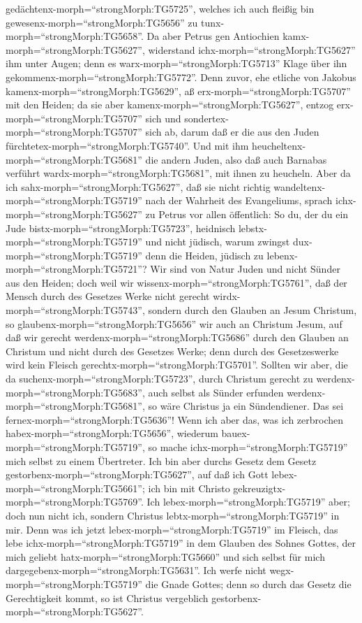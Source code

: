 gedächtenx-morph=``strongMorph:TG5725'', welches ich auch fleißig bin
gewesenx-morph=``strongMorph:TG5656'' zu
tunx-morph=``strongMorph:TG5658''.  Da aber Petrus gen
Antiochien kamx-morph=``strongMorph:TG5627'', widerstand
ichx-morph=``strongMorph:TG5627'' ihm unter Augen; denn es
warx-morph=``strongMorph:TG5713'' Klage über ihn
gekommenx-morph=``strongMorph:TG5772''.  Denn zuvor, ehe
etliche von Jakobus kamenx-morph=``strongMorph:TG5629'', aß
erx-morph=``strongMorph:TG5707'' mit den Heiden; da sie aber
kamenx-morph=``strongMorph:TG5627'', entzog
erx-morph=``strongMorph:TG5707'' sich und
sondertex-morph=``strongMorph:TG5707'' sich ab, darum daß er die aus den
Juden fürchtetex-morph=``strongMorph:TG5740''.  Und mit ihm
heucheltenx-morph=``strongMorph:TG5681'' die andern Juden, also daß auch
Barnabas verführt wardx-morph=``strongMorph:TG5681'', mit ihnen zu
heucheln.  Aber da ich sahx-morph=``strongMorph:TG5627'',
daß sie nicht richtig wandeltenx-morph=``strongMorph:TG5719'' nach der
Wahrheit des Evangeliums, sprach ichx-morph=``strongMorph:TG5627'' zu
Petrus vor allen öffentlich: So du, der du ein Jude
bistx-morph=``strongMorph:TG5723'', heidnisch
lebstx-morph=``strongMorph:TG5719'' und nicht jüdisch, warum zwingst
dux-morph=``strongMorph:TG5719'' denn die Heiden, jüdisch zu
lebenx-morph=``strongMorph:TG5721''?  Wir sind von Natur
Juden und nicht Sünder aus den Heiden;  doch weil wir
wissenx-morph=``strongMorph:TG5761'', daß der Mensch durch des Gesetzes
Werke nicht gerecht wirdx-morph=``strongMorph:TG5743'', sondern durch
den Glauben an Jesum Christum, so glaubenx-morph=``strongMorph:TG5656''
wir auch an Christum Jesum, auf daß wir gerecht
werdenx-morph=``strongMorph:TG5686'' durch den Glauben an Christum und
nicht durch des Gesetzes Werke; denn durch des Gesetzeswerke wird kein
Fleisch gerechtx-morph=``strongMorph:TG5701''.  Sollten wir
aber, die da suchenx-morph=``strongMorph:TG5723'', durch Christum
gerecht zu werdenx-morph=``strongMorph:TG5683'', auch selbst als Sünder
erfunden werdenx-morph=``strongMorph:TG5681'', so wäre Christus ja ein
Sündendiener. Das sei fernex-morph=``strongMorph:TG5636''! 
Wenn ich aber das, was ich zerbrochen
habex-morph=``strongMorph:TG5656'', wiederum
bauex-morph=``strongMorph:TG5719'', so mache
ichx-morph=``strongMorph:TG5719'' mich selbst zu einem Übertreter.
 Ich bin aber durchs Gesetz dem Gesetz
gestorbenx-morph=``strongMorph:TG5627'', auf daß ich Gott
lebex-morph=``strongMorph:TG5661''; ich bin mit Christo
gekreuzigtx-morph=``strongMorph:TG5769''.  Ich
lebex-morph=``strongMorph:TG5719'' aber; doch nun nicht ich, sondern
Christus lebtx-morph=``strongMorph:TG5719'' in mir. Denn was ich jetzt
lebex-morph=``strongMorph:TG5719'' im Fleisch, das lebe
ichx-morph=``strongMorph:TG5719'' in dem Glauben des Sohnes Gottes, der
mich geliebt hatx-morph=``strongMorph:TG5660'' und sich selbst für mich
dargegebenx-morph=``strongMorph:TG5631''.  Ich werfe nicht
wegx-morph=``strongMorph:TG5719'' die Gnade Gottes; denn so durch das
Gesetz die Gerechtigkeit kommt, so ist Christus vergeblich
gestorbenx-morph=``strongMorph:TG5627''.


